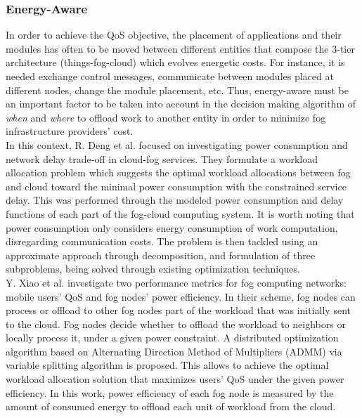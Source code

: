 
\subsubsection{Energy-Aware}\label{sec:energy}
\noindent In order to achieve the QoS objective, the placement of applications and their modules has often to be moved between different entities that compose the 3-tier architecture (things-fog-cloud) which evolves energetic costs. For instance, it is needed exchange control messages, communicate between modules placed at different nodes, change the module placement, etc. Thus, energy-aware must be an important factor to be taken into account in the decision making algorithm of \textit{when} and \textit{where} to offload work to another entity in order to minimize fog infrastructure providers' cost.\\
\noindent\tab In this context, R. Deng et al. \cite{deng2016optimal} focused on investigating power consumption and network delay trade-off in cloud-fog services. They formulate a workload allocation problem which suggests the optimal workload allocations between fog and cloud toward the minimal power consumption with the constrained service delay. This was performed through the modeled power consumption and delay functions of each part of the fog-cloud computing system. It is worth noting that power consumption only considers energy consumption of work computation, disregarding communication costs. The problem is then tackled using an approximate approach through decomposition, and formulation of three subproblems, being solved through existing optimization techniques.\\
\noindent\tab Y. Xiao et al. \cite{xiao2017qoe} investigate two performance metrics for fog computing networks: mobile users’ QoS and fog nodes’ power efficiency. In their scheme, fog nodes can process or offload to other fog nodes part of the workload that was initially sent to the cloud. Fog nodes decide whether to offload the workload to neighbors or locally process it, under a given power constraint. A distributed optimization algorithm based on Alternating Direction Method of Multipliers (ADMM) via variable splitting algorithm is proposed. This allows to achieve the optimal workload allocation solution that maximizes users’ QoS under the given power efficiency. In this work, power efficiency of each fog node is measured by the amount of consumed energy to offload each unit of workload from the cloud.\\
